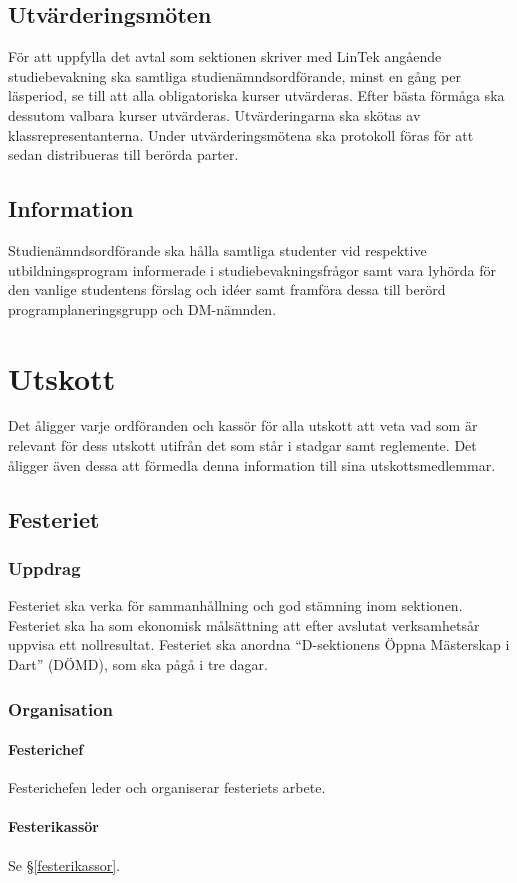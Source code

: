 \documentclass{datateknologsektionen-document}
\begin{document}
\subsection{Utvärderingsmöten}
\label{utvarderingsmoten}
För att uppfylla det avtal som sektionen skriver med LinTek angående studiebevakning ska
samtliga studienämndsordförande, minst en gång per läsperiod, se till att alla obligatoriska kurser
utvärderas. Efter bästa förmåga ska dessutom valbara kurser utvärderas. Utvärderingarna ska
skötas av klassrepresentanterna. Under utvärderingsmötena ska protokoll föras för att sedan
distribueras till berörda parter.
\subsection{Information}
Studienämndsordförande ska hålla samtliga studenter vid respektive utbildningsprogram
informerade i studiebevakningsfrågor samt vara lyhörda för den vanlige studentens förslag och
idéer samt framföra dessa till berörd programplaneringsgrupp och DM-nämnden.
\section{Utskott}
Det åligger varje ordföranden och kassör för alla utskott att veta vad som är relevant för dess
utskott utifrån det som står i stadgar samt reglemente. Det åligger även dessa att förmedla denna
information till sina utskottsmedlemmar.
\subsection{Festeriet}
\label{festeriet}
\subsubsection{Uppdrag}
Festeriet ska verka för sammanhållning och god stämning inom sektionen. Festeriet ska ha som
ekonomisk målsättning att efter avslutat verksamhetsår uppvisa ett nollresultat. Festeriet ska
anordna ``D-sektionens Öppna Mästerskap i Dart'' (DÖMD), som ska pågå i tre dagar.
\subsubsection{Organisation}
\paragraph{Festerichef}
Festerichefen leder och organiserar festeriets arbete.
\paragraph{Festerikassör}
Se \S \ref{festerikassor}.
\end{document}
